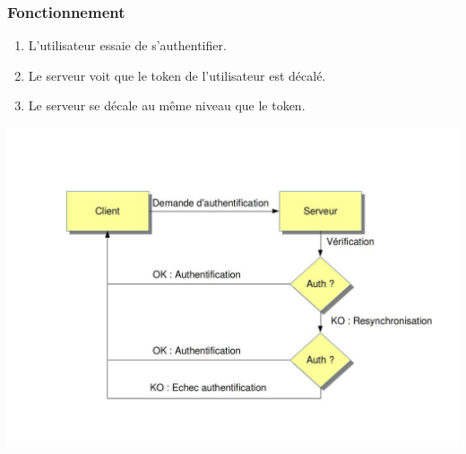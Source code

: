 \documentclass{"../../res/univ-projet"}
\begin{document}
\subsubsection{Fonctionnement}
\begin{enumerate}
    \item L'utilisateur essaie de s'authentifier.
    \item Le serveur voit que le token de l'utilisateur est décalé.
    \item Le serveur se décale au même niveau que le token.
\end{enumerate}
\includegraphics[width=\textwidth]{../graphics/resynchronisation.jpg}
\end{document}
